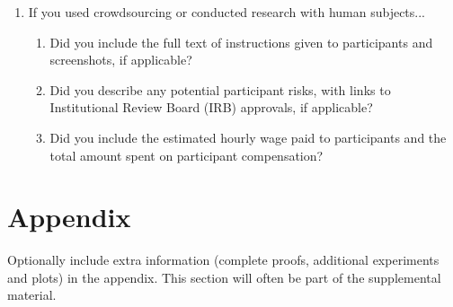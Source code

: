 \documentclass{article}
\begin{document}
\begin{enumerate}
\item If you used crowdsourcing or conducted research with human subjects...
\begin{enumerate}
  \item Did you include the full text of instructions given to participants and screenshots, if applicable?
    \answerTODO{}
  \item Did you describe any potential participant risks, with links to Institutional Review Board (IRB) approvals, if applicable?
    \answerTODO{}
  \item Did you include the estimated hourly wage paid to participants and the total amount spent on participant compensation?
    \answerTODO{}
\end{enumerate}


\end{enumerate}




\appendix


\section{Appendix}


Optionally include extra information (complete proofs, additional experiments and plots) in the appendix.
This section will often be part of the supplemental material.
\end{document}
